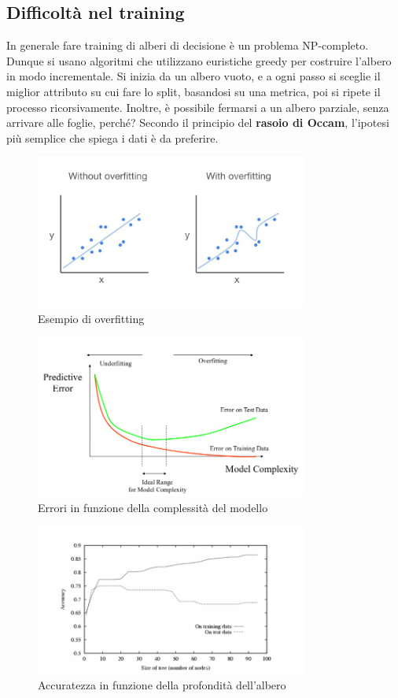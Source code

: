 \subsection{Difficoltà nel training}
In generale fare training di alberi di decisione è un problema NP-completo.
Dunque si usano algoritmi che utilizzano euristiche greedy per costruire l'albero in modo incrementale.
Si inizia da un albero vuoto, e a ogni passo si sceglie il miglior attributo su cui fare lo split, basandosi su una metrica, poi si ripete il processo ricorsivamente.
Inoltre, è possibile fermarsi a un albero parziale, senza arrivare alle foglie, perché?
Secondo il principio del \textbf{rasoio di Occam}, l'ipotesi più semplice che spiega i dati è da preferire.
\begin{figure}[H]
	\centering
	\includegraphics[width=0.8\textwidth]{pictures/overfitting.png}
	\caption{Esempio di overfitting}
\end{figure} 
\begin{figure}[H]
	\centering
	\includegraphics[width=0.8\textwidth]{pictures/overfittingCorrelation.png}
	\caption{Errori in funzione della complessità del modello}
\end{figure}
\begin{figure}[H]
	\centering
	\includegraphics[width=0.8\textwidth]{pictures/overfittingTree.png}
	\caption{Accuratezza in funzione della profondità dell'albero}
\end{figure}
